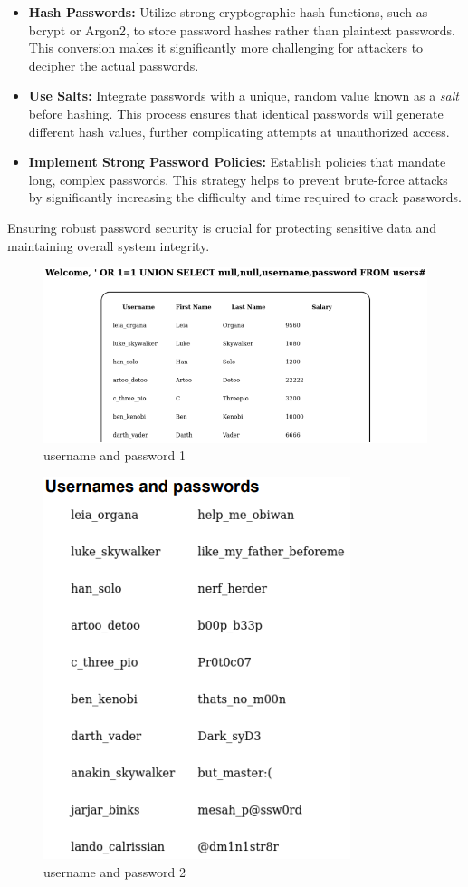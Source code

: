 \begin{itemize}
    \item \textbf{Hash Passwords:} Utilize strong cryptographic hash functions, such as bcrypt or Argon2, to store password hashes rather than plaintext passwords. This conversion makes it significantly more challenging for attackers to decipher the actual passwords.
    \item \textbf{Use Salts:} Integrate passwords with a unique, random value known as a \textit{salt} before hashing. This process ensures that identical passwords will generate different hash values, further complicating attempts at unauthorized access.
    \item \textbf{Implement Strong Password Policies:} Establish policies that mandate long, complex passwords. This strategy helps to prevent brute-force attacks by significantly increasing the difficulty and time required to crack passwords.
\end{itemize}

Ensuring robust password security is crucial for protecting sensitive data and maintaining overall system integrity.

\begin{figure}[H]
    \centering
    \includegraphics[width=\linewidth]{pic/username and password 1.png}
    \caption{username and password 1}
    \label{fig:username and password 1}
\end{figure}

\begin{figure}[H]
    \centering
    \includegraphics[width=0.4\linewidth]{pic/username and password 2.png}
    \caption{username and password 2}
    \label{fig:username and password 2}
\end{figure}


